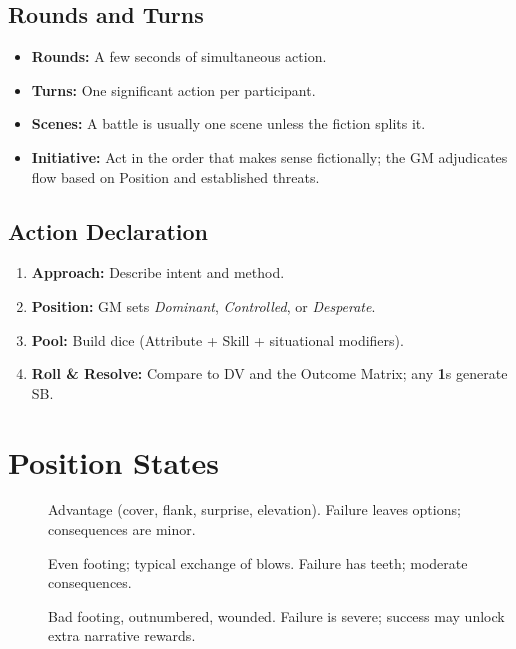 \subsection{Rounds and Turns}\label{subsec:rounds_turns}
\begin{itemize}
    \item \textbf{Rounds:} A few seconds of simultaneous action.
    \item \textbf{Turns:} One significant action per participant.
    \item \textbf{Scenes:} A battle is usually one scene unless the fiction splits it.
    \item \textbf{Initiative:} Act in the order that makes sense fictionally; the GM adjudicates flow based on Position and established threats.
\end{itemize}

\subsection{Action Declaration}\label{subsec:action_declaration}
\begin{enumerate}
    \item \textbf{Approach:} Describe intent and method.
    \item \textbf{Position:} GM sets \textit{Dominant}, \textit{Controlled}, or \textit{Desperate}.
    \item \textbf{Pool:} Build dice (Attribute + Skill + situational modifiers).
    \item \textbf{Roll \& Resolve:} Compare to DV and the Outcome Matrix; any \textbf{1}s generate SB.
\end{enumerate}

\section{Position States}\label{sec:position_states}
\begin{description}
    \item[] Advantage (cover, flank, surprise, elevation). Failure leaves options; consequences are minor.
    \item[] Even footing; typical exchange of blows. Failure has teeth; moderate consequences.
    \item[] Bad footing, outnumbered, wounded. Failure is severe; success may unlock extra narrative rewards.
\end{description}

